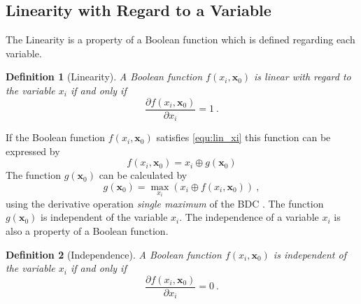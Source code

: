 \documentclass[a4paper]{article}
\newtheorem{definition}{Definition}
\newcommand\bx{\mathbf{x}}
\begin{document}
\subsection{Linearity with Regard to a Variable}
\label{subsec:lin_wrt_v}
The Linearity is a property of a Boolean function which is defined regarding each variable. 

\begin{definition}[Linearity]
A Boolean function $f(x_i,\bx_0)$ is linear with regard to the variable $x_i$ if and only if
\begin{equation}
\frac{\partial f(x_i,\bx_0)}{\partial x_i} = 1~.
\label{equ:lin_xi}
\end{equation}
\end{definition}

If the Boolean function $f(x_i,\bx_0)$ satisfies \eqref{equ:lin_xi} this function can be expressed by
\begin{equation}
f(x_i,\bx_0)=x_i \oplus g(\bx_0)
\label{equ:lin_sep_xi}
\end{equation}
The function $g(\bx_0)$ can be calculated by
\begin{equation}
g(\bx_0) = \max_{x_i} \left(x_i \oplus f(x_i,\bx_0)\right)~,
\label{equ:g_x0}
\end{equation}
using the derivative operation \textit{single maximum} of the BDC \cite{SP_BDC_2010}. The function $g(\bx_0)$ is independent of the variable $x_i$. The independence of a variable $x_i$ is also a property of a Boolean function.

\begin{definition}[Independence]
A Boolean function $f(x_i,\bx_0)$ is independent of the variable $x_i$ if and only if
\begin{equation}
\frac{\partial f(x_i,\bx_0)}{\partial x_i} = 0~.
\label{equ:indep_xi}
\end{equation}
\end{definition}
\end{document}
